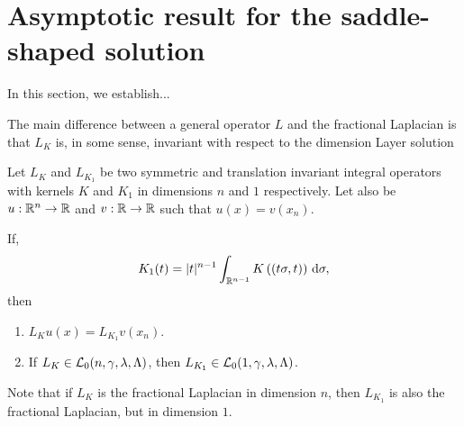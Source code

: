 \section{Asymptotic result for the saddle-shaped solution}
\label{Sec:Asymptotic}

In this section, we establish...


The main difference between a general operator $L$ and the fractional Laplacian is that $L_K$ is, in some sense, invariant with respect to the dimension 
Layer solution


\begin{proposition}
	\label{Prop:KernelsDimension}
	Let $L_K $ and $L_{K_1}$ be two symmetric and translation invariant integral operators with kernels $K$ and $K_1$ in dimensions $n$ and $1$ respectively. Let also be $u:\mathbb{R}^n\to\mathbb{R}$ and $v:\mathbb{R}\to\mathbb{R}$ such that $u(x) = v(x_n)$.
	
	If,
	$$ K_1(t) = |t|^{n-1} \int_{\mathbb{R}^{n-1}} K\left((t\sigma,t)\right) \,\mathrm{d} \sigma, $$
	then
	\begin{enumerate}[label=(\roman{*})]
		\item $L_K u(x) = L_{K_1} v(x_n)$.
		\item If $L_K \in \mathcal{L}_0 (n,\gamma,\lambda,\Lambda)$, then   $L_{K_1} \in \mathcal{L}_0 (1,\gamma,\lambda,\Lambda)$.
	\end{enumerate}
\end{proposition}

Note that if $L_K $ is the fractional Laplacian in dimension $n$, then $L_{K_1}$ is also the fractional Laplacian, but in dimension $1$.

